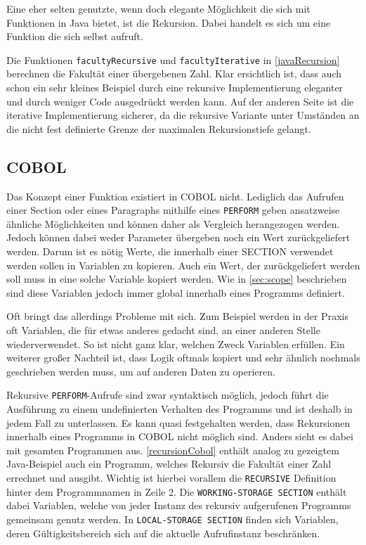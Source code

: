 Eine eher selten genutzte, wenn doch elegante Möglichkeit die sich mit Funktionen in Java bietet, ist die Rekursion. Dabei handelt es sich um eine Funktion die sich selbst aufruft. 


Die Funktionen \texttt{facultyRecursive} und \texttt{facultyIterative} in \autoref{javaRecursion} berechnen  die Fakultät einer übergebenen Zahl. Klar ersichtlich ist, dass auch schon ein sehr kleines Beispiel durch eine rekursive Implementierung eleganter und durch weniger Code ausgedrückt werden kann. Auf der anderen Seite ist die iterative Implementierung sicherer, da die rekursive Variante unter Umständen an die nicht fest definierte Grenze der maximalen Rekursionstiefe gelangt.

\subsection*{COBOL}
Das Konzept einer Funktion existiert in COBOL nicht. Lediglich das Aufrufen einer Section oder eines Paragraphs mithilfe eines \texttt{PERFORM} geben ansatzweise ähnliche Möglichkeiten und können daher als Vergleich herangezogen werden. Jedoch können dabei weder Parameter übergeben noch ein Wert zurückgeliefert werden. Darum ist es nötig Werte, die innerhalb einer SECTION verwendet werden sollen in Variablen zu kopieren. Auch ein Wert, der zurückgeliefert werden soll muss in eine solche Variable kopiert werden. Wie in \autoref{sec:scope} beschrieben sind diese Variablen jedoch immer global innerhalb eines Programms definiert.

Oft bringt das allerdings Probleme mit sich. Zum Beispiel werden in der Praxis oft Variablen, die für etwas anderes gedacht sind, an einer anderen Stelle wiederverwendet. So ist nicht ganz klar, welchen Zweck Variablen erfüllen. Ein weiterer großer Nachteil ist, dass Logik oftmals kopiert und sehr ähnlich nochmals geschrieben werden muss, um auf anderen Daten zu operieren.

Rekursive \texttt{PERFORM}-Aufrufe sind zwar syntaktisch möglich, jedoch führt die Ausführung zu einem undefinierten Verhalten des Programms und ist deshalb in jedem Fall zu unterlassen. Es kann quasi festgehalten werden, dass Rekursionen innerhalb eines Programms in COBOL nicht möglich sind. Anders sieht es dabei mit gesamten Programmen aus.
\autoref{recursionCobol} enthält analog zu gezeigtem Java-Beispiel auch ein Programm, welches Rekursiv die Fakultät einer Zahl errechnet und ausgibt. Wichtig ist hierbei vorallem die \texttt{RECURSIVE} Definition hinter dem Programmnamen in Zeile 2. Die \texttt{WORKING-STORAGE SECTION} enthält dabei Variablen, welche von jeder Instanz des rekursiv aufgerufenen Programms gemeinsam genutz werden. In \texttt{LOCAL-STORAGE SECTION} finden sich Variablen, deren Gültigkeitsbereich sich auf die aktuelle Aufrufinstanz beschränken.